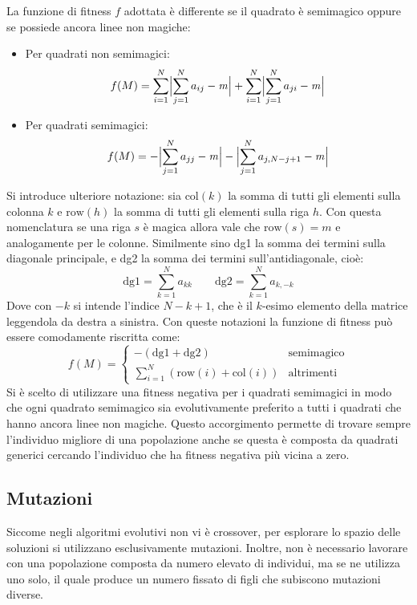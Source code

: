 \documentclass[italian,twoside,twocolumn]{article}
\begin{document}
La funzione di fitness $ f $ adottata è differente se il quadrato è semimagico oppure se possiede ancora linee non magiche:
\begin{itemize}
	\item Per quadrati non semimagici:
	\[	f(M) = \sum_{i=1}^{N}\Bigl\lvert\sum_{j=1}^{N} a_{ij} - \mathit{m} \Bigr\rvert + \sum_{i=1}^{N}\Bigl\lvert\sum_{j=1}^{N} a_{ji} - \mathit{m} \Bigr\rvert 	\]
	\item Per quadrati semimagici:
	\[	f(M) = -\Bigl\lvert\sum_{j=1}^{N} a_{jj} - \mathit{m} \Bigr\rvert - \Bigl\lvert\sum_{j=1}^{N} a_{j,N-j+1} - \mathit{m} \Bigr\rvert 	\]	
\end{itemize}
Si introduce ulteriore notazione: sia $ \text{col}(k) $ la somma di tutti gli elementi sulla colonna $ k $ e $ \text{row}(h) $ la somma di tutti gli elementi sulla riga $ h $. Con questa nomenclatura se una riga $ s $ è magica allora vale che $ \text{row}(s) = \mathit{m}$ e analogamente per le colonne. Similmente sino dg1 la somma dei termini sulla diagonale principale, e dg2 la somma dei termini sull'antidiagonale, cioè:
\[\text{dg1} = \sum_{k = 1}^Na_{kk}  \qquad \text{dg2} = \sum_{k = 1}^Na_{k,-k}  \]
Dove con $ -k $ si intende l'indice $ N-k+1 $, che è il $ k $-esimo elemento della matrice leggendola da destra a sinistra.
Con queste notazioni la funzione di fitness può essere comodamente riscritta come:
\[ f(M) = 
\begin{cases}
- \left(\text{dg1} + \text{dg2} \right) & \text{semimagico} \\
\sum_{i = 1}^{N}\left(\text{row}(i) + \text{col}(i) \right) & \text{altrimenti} 
\end{cases}
\]
Si è scelto di utilizzare una fitness negativa per i quadrati semimagici in modo che ogni quadrato semimagico sia evolutivamente preferito a tutti i quadrati che hanno ancora linee non magiche. Questo accorgimento permette di trovare sempre l'individuo migliore di una popolazione anche se questa è composta da quadrati generici cercando l'individuo che ha fitness negativa più vicina a zero.   

\subsection{Mutazioni}
Siccome negli algoritmi evolutivi non vi è crossover, per esplorare lo spazio delle soluzioni si utilizzano esclusivamente mutazioni. Inoltre, non è necessario lavorare con una popolazione composta da numero elevato di individui, ma se ne utilizza uno solo, il quale produce un numero fissato di figli che subiscono mutazioni diverse.
\end{document}

